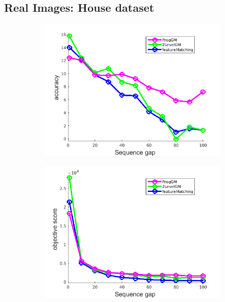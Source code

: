 \documentclass[
	fontsize=12pt,
	paper=a4,
	twoside=false,
	numbers=noenddot,
	plainheadsepline,
	toc=listof,
	toc=bibliography
]{scrartcl}
\begin{document}
\subsection{Real Images: House dataset}
\vspace{-20pt}
\begin{figure}[h] 
	\begin{subfigure}[b]{0.3\textwidth}
		\centering
		\includegraphics[scale=0.25]{"fig_ver2608/RealImages/House_seq/no_descr/using_cdf_afftrafo/solution/performance/accuracy"}  
	\end{subfigure}%
	\begin{subfigure}[b]{0.3\textwidth}
		\centering
		\includegraphics[scale=0.25]{"fig_ver2608/RealImages/House_seq/no_descr/using_cdf_afftrafo/solution/performance/score"}  

\end{subfigure}
\end{figure}
\end{document}
